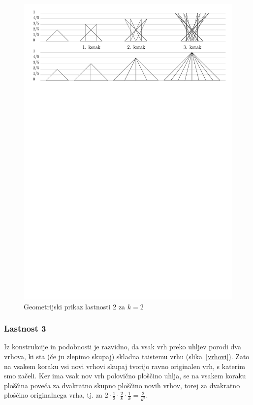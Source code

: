 \documentclass[a4paper, 12pt]{article}
\begin{document}
\begin{figure}[h!]
    \centering
    \includegraphics[width=\textwidth]{ipe_slike/lastnost2.pdf}
    \caption{Geometrijski prikaz lastnosti 2 za $ k = 2 $}
    \label{lastnost2}
\end{figure}


\subsubsection*{Lastnost 3}

Iz konstrukcije in podobnosti je razvidno, da vsak vrh preko uhljev porodi dva vrhova, ki sta (če ju zlepimo skupaj) skladna taistemu vrhu (slika~\ref{vrhovi}). Zato na vsakem koraku vsi novi vrhovi skupaj tvorijo ravno originalen vrh, s katerim smo začeli. Ker ima vsak nov vrh polovično ploščino uhlja, se na vsakem koraku ploščina poveča za dvakratno skupno ploščino novih vrhov, torej za dvakratno ploščino originalnega vrha, tj. za $ 2 \cdot \frac{1}{2} \cdot \frac{2}{k} \cdot \frac{1}{k} = \frac{2}{k^2} $.
\end{document}
